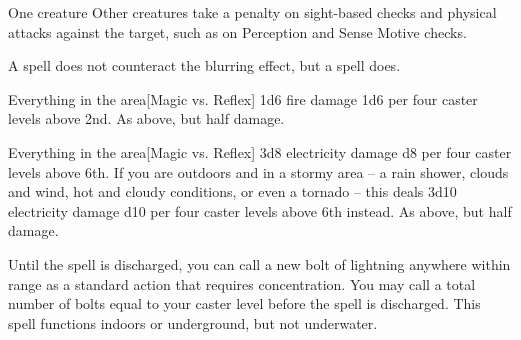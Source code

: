 \spellrng{\rngclose}
\spelldur{\durshort \dismissable}
\begin{spelltarget}{One creature}
    \spelleffect Other creatures take a  penalty on sight-based checks and physical attacks against the target, such as on Perception and Sense Motive checks.
\end{spelltarget}
\spellnotes A  spell does not counteract the blurring effect, but a  spell does.

\begin{spelltargets}{Everything in the area}[Magic vs. Reflex]
    \spellsuccess 1d6 fire damage \add 1d6 per four caster levels above 2nd.
    \spellfailure As above, but half damage.
\end{spelltargets}

\begin{comment}
\subsubsection{C}
\end{comment}

\begin{spelltargets}{Everything in the area}[Magic vs. Reflex]
    \spellsuccess 3d8 electricity damage \add d8 per four caster levels above 6th. If you are outdoors and in a stormy area -- a rain shower, clouds and wind, hot and cloudy conditions, or even a tornado -- this deals 3d10 electricity damage \add d10 per four caster levels above 6th instead.
    \spellfailure As above, but half damage.
\end{spelltargets}
\spelleffect Until the spell is discharged, you can call a new bolt of lightning anywhere within range as a standard action that requires concentration. You may call a total number of bolts equal to your caster level before the spell is discharged.
\spellnotes This spell functions indoors or underground, but not underwater. \destructivespellnotes

